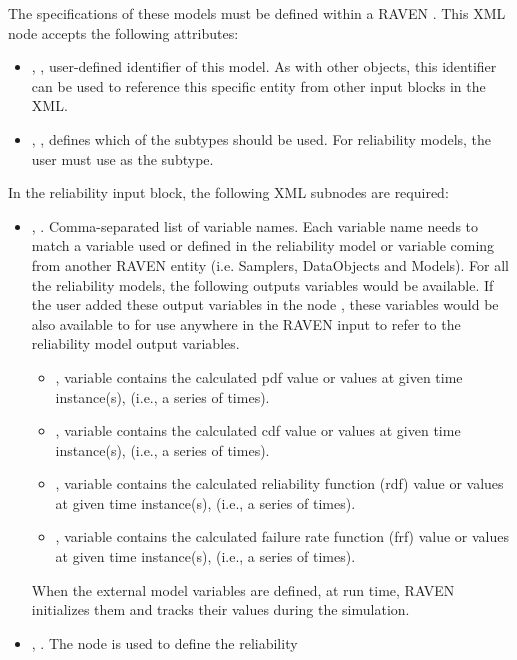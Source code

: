 The specifications of these models must be defined within a RAVEN . This
XML node accepts the following attributes:
\begin{itemize}
	\item {}, , user-defined identifier of this model.
	\nb As with other objects, this identifier can be used to reference this specific entity from other
	input blocks in the XML.
	\item {}, , defines which of the subtypes should
	be used. For reliability models, the user must use  as the subtype.
\end{itemize}
In the reliability  input block, the following XML subnodes are required:
\begin{itemize}
	\item {}, . Comma-separated list of variable
	names. Each variable name needs to match a variable used or defined in the reliability model or variable
	coming from another RAVEN entity (i.e. Samplers, DataObjects and Models).
	\nb For all the reliability models, the following outputs variables would be available. If the user
	added these output variables in the node , these variables would be also available to
	for use anywhere in the RAVEN input to refer to the reliability model output variables.
	\begin{itemize}
		\item {}, variable contains the calculated pdf value or values at given time instance(s),
		(i.e., a series of times).
		\item {}, variable contains the calculated cdf value or values at given time instance(s),
		(i.e., a series of times).
		\item {}, variable contains the calculated reliability function (rdf) value or values at
		given time instance(s), (i.e., a series of times).
		\item {}, variable contains the calculated failure rate function (frf) value or values
		at given time instance(s), (i.e., a series of times).
	\end{itemize}
	\nb When the external model variables are defined, at run time, RAVEN initializes
	them and tracks their values during the simulation.
	\item {}, . The node is used to define the reliability

\end{itemize}
